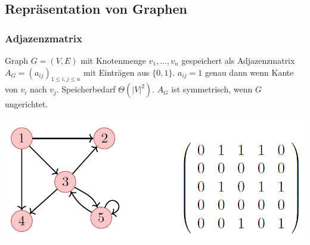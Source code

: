 \vspace{-4pt}
\begin{sectionbox}
\subsection{Repräsentation von Graphen}\smallskip

\subsubsection{Adjazenzmatrix}\par\smallskip
Graph $G=(V, E)$ mit Knotenmenge $v_{1}, \ldots, v_{n}$ gespeichert als Adjazenzmatrix $A_{G}=\left(a_{i j}\right)_{1 \leq i, j \leq n}$ mit Einträgen aus $\{0,1\}$. $a_{i j}=1$ genau dann wenn Kante von $v_{i}$ nach $v_{j}$. Speicherbedarf $\Theta\left(|V|^{2}\right)$. $A_{G}$ ist symmetrisch, wenn $G$ ungerichtet.\par\smallskip
\begin{center}
    \includegraphics[width = 0.9\columnwidth]{../img/AdjMa.png}
\end{center}\vspace{10px}


\end{sectionbox}

